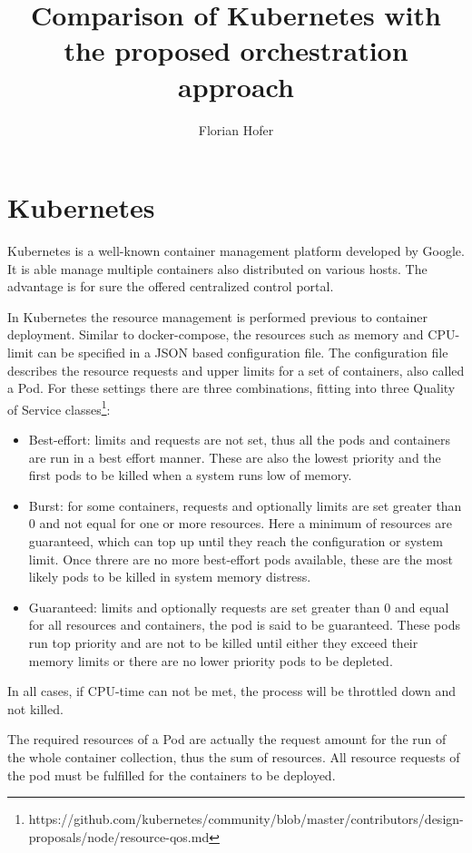 \documentclass[]{scrartcl}
\title{Comparison of Kubernetes with the proposed orchestration approach}
\author{Florian Hofer}
\begin{document}
\maketitle

\section{Kubernetes}

Kubernetes is a well-known container management platform developed by Google. It is able manage multiple containers also distributed on various hosts. The advantage is for sure the offered centralized control portal. 

In Kubernetes the resource management is performed previous to container deployment. Similar to docker-compose, the resources such as memory and CPU-limit can be specified in a JSON based configuration file. The configuration file describes the resource requests and upper limits for a set of containers, also called a Pod. 
For these settings there are three combinations, fitting into three Quality of Service classes\footnote{https://github.com/kubernetes/community/blob/master/contributors/design-proposals/node/resource-qos.md}:
\begin{itemize}
	\item Best-effort: limits and requests are not set, thus all the pods and containers are run in a best effort manner. These are also the lowest priority and the first pods to be killed when a system runs low of memory.
	\item Burst: for some containers, requests and optionally limits are set greater than 0 and not equal for one or more resources. Here a minimum of resources are guaranteed, which can top up until they reach the configuration or system limit. Once threre are no more best-effort pods available, these are the most likely pods to be killed in system memory distress.
	\item Guaranteed: limits and optionally requests are set greater than 0 and equal for all resources and containers, the pod is said to be guaranteed. These pods run top priority and are not to be killed until either they exceed their memory limits or there are no lower priority pods to be depleted. 
\end{itemize}
In all cases, if CPU-time can not be met, the process will be throttled down and not killed.

The required resources of a Pod are actually the request amount for the run of the whole container collection, thus the sum of resources. All resource requests of the pod must be fulfilled for the containers to be deployed.
\end{document}
